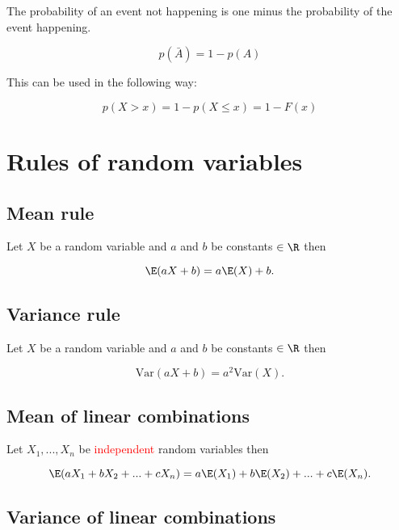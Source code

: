The probability of an event not happening is one minus the probability of the event happening. 

\begin{equation}
    p(\bar{A}) = 1 - p(A)
\end{equation}

This can be used in the following way:

\begin{equation}
    p(X > x) = 1 - p(X \leq x) = 1 - F(x)
\end{equation}
    
\section{Rules of random variables}

\subsection{Mean rule}

Let $X$ be a random variable and $a$ and $b$ be constants $\in \R$ then

\begin{equation}
    \E(aX + b) = a\E(X) + b.
\end{equation}

\subsection{Variance rule}

Let $X$ be a random variable and $a$ and $b$ be constants $\in \R$ then

\begin{equation}
    \text{Var}(aX + b) = a^2 \text{Var}(X).
\end{equation}

\subsection{Mean of linear combinations}

Let $X_1, ... , X_n$ be \textcolor{red}{independent} random variables then

\begin{equation}
    \E(aX_1 + bX_2 + ... + cX_n) = a\E(X_1) + b\E(X_2) + ... + c\E(X_n).
\end{equation}

\subsection{Variance of linear combinations}

